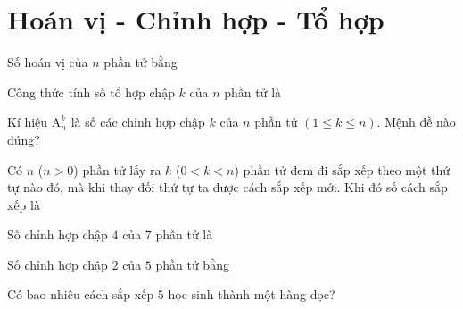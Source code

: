 \section{Hoán vị - Chỉnh hợp - Tổ hợp}
\begin{ex}%
    Số hoán vị của $n$ phần tử bằng
\end{ex}
\begin{ex}%
Công thức tính số tổ hợp chập $k$ của $n$ phần tử là
\end{ex}
\begin{ex}%
    Kí hiệu $\mathrm{A}_n^k$ là số các chỉnh hợp chập $k$ của $n$ phần tử $(1 \le k \le n)$. Mệnh đề nào đúng?
\end{ex}
\begin{ex}%
    Có $n$ ($n>0$) phần tử lấy ra $k$ ($0<k<n$) phần tử đem đi sắp xếp theo một thứ tự nào đó, mà khi thay đối thứ tự ta được cách sắp xếp mới. Khi đó số cách sắp xếp là
\end{ex}
\begin{ex}%
    Số chỉnh hợp chập $4$ của $7$ phần tử là
\end{ex}
\begin{ex}%
    Số chỉnh hợp chập $2$ của $5$ phần tử bằng
\end{ex}
\begin{ex}%
    Có bao nhiêu cách sắp xếp $5$ học sinh thành một hàng dọc?
\end{ex}
